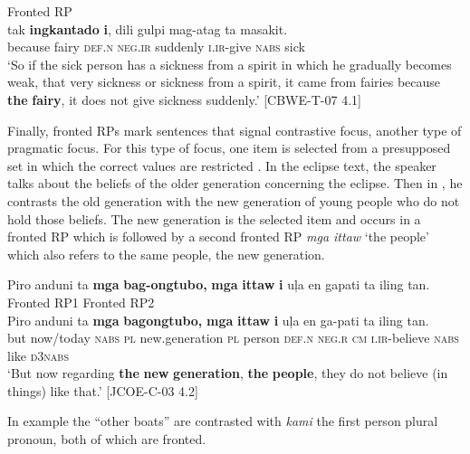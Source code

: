 \hspace{1.4cm}Fronted RP \\
\gll tak \textbf{ingkantado}  \textbf{i},  dili  gulpi  mag-atag  ta  masakit. \\
because fairy  \textsc{def.n}  \textsc{neg.ir}  suddenly  \textsc{i.ir}-give  \textsc{nabs} sick \\
\glt `So if the sick person has a sickness from a spirit in which he gradually becomes weak, that very sickness or sickness from a spirit, it came from fairies because \textbf{the} \textbf{fairy}, it does not give sickness suddenly.’ [CBWE-T-07 4.1]
\z

Finally, fronted RPs mark sentences that signal contrastive focus, another type of pragmatic focus. For this type of focus, one item is selected from a presupposed set in which the correct values are restricted \citep{dik1981}. In the eclipse text, the speaker talks about the beliefs of the older generation concerning the eclipse. Then in , he contrasts the old generation with the new generation of young people who do not hold those beliefs. The new generation is the selected item and occurs in a fronted RP which is followed by a second fronted RP \textit{mga ittaw} ‘the people’ which also refers to the same people, the new generation.

\ea 
\label{bkm:Ref372890039}
Piro  anduni  ta  \textbf{mga}  \textbf{bag-ongtubo,}  \textbf{mga}  \textbf{ittaw}  \textbf{i}  uļa  en  gapati ta  iling  tan. \\\smallskip
\hspace{3.4cm}Fronted RP1\hspace{1.3cm}  Fronted RP2 \\
\gll Piro  anduni  ta  \textbf{mga}  \textbf{bagongtubo,}  \textbf{mga}  \textbf{ittaw}  \textbf{i}  uļa  en  ga-pati ta  iling  tan. \\
but  now/today  \textsc{nabs}  \textsc{pl}  new.generation  \textsc{pl}  person  \textsc{def.n}  \textsc{neg.r}  \textsc{cm}  \textsc{i.ir}-believe
\textsc{nabs}  like  \textsc{d}3\textsc{nabs} \\
\glt `But now regarding \textbf{the} \textbf{new} \textbf{generation}, \textbf{the} \textbf{people}, they do not believe (in things) like that.’ [JCOE-C-03 4.2]
\z

In example  the “other boats” are contrasted with \textit{kami} the first person plural pronoun, both of which are fronted.

